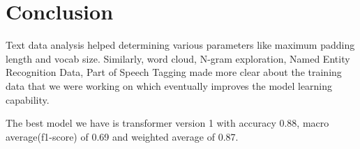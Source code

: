 \chapter{Conclusion}
Text data analysis helped determining various parameters like maximum padding length and vocab size. Similarly, word cloud, N-gram exploration, Named Entity Recognition Data, Part of Speech Tagging made more clear about the training data that we were working on which eventually improves the model learning capability.

The best model we have is transformer version 1 with accuracy 0.88, macro average(f1-score) of 0.69 and weighted average of 0.87.